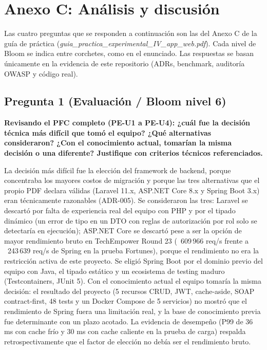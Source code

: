 \documentclass[12pt,a4paper]{article}
\begin{document}
\newpage

\section*{Anexo C: Análisis y discusión}

Las cuatro preguntas que se responden a continuación son las del Anexo C de la guía de
práctica (\textit{guia\_practica\_experimental\_IV\_app\_web.pdf}). Cada nivel de Bloom
se indica entre corchetes, como en el enunciado. Las respuestas se basan únicamente en
la evidencia de este repositorio (ADRs, benchmark, auditoría OWASP y código real).

\subsection*{Pregunta 1 (Evaluación / Bloom nivel 6)}

\textbf{Revisando el PFC completo (PE-U1 a PE-U4): ¿cuál fue la decisión técnica más
difícil que tomó el equipo? ¿Qué alternativas consideraron? ¿Con el conocimiento actual,
tomarían la misma decisión o una diferente? Justifique con criterios técnicos
referenciados.}

La decisión más difícil fue la elección del framework de backend, porque concentraba los
mayores costos de migración y porque las tres alternativas que el propio PDF declara
válidas (Laravel 11.x, ASP.NET Core 8.x y Spring Boot 3.x) eran técnicamente razonables
(ADR-005). Se consideraron las tres: Laravel se descartó por falta de experiencia real
del equipo con PHP y por el tipado dinámico (un error de tipo en un DTO con reglas de
autorización por rol solo se detectaría en ejecución); ASP.NET Core se descartó pese a ser
la opción de mayor rendimiento bruto en TechEmpower Round 23 (~609\,966 req/s frente a
~243\,639 req/s de Spring en la prueba Fortunes), porque el rendimiento no era la
restricción activa de este proyecto. Se eligió Spring Boot por el dominio previo del
equipo con Java, el tipado estático y un ecosistema de testing maduro (Testcontainers,
JUnit 5). Con el conocimiento actual el equipo tomaría la misma decisión: el resultado
del proyecto (5 recursos CRUD, JWT, cache-aside, SOAP contract-first, 48 tests y un
Docker Compose de 5 servicios) no mostró que el rendimiento de Spring fuera una limitación
real, y la base de conocimiento previa fue determinante con un plazo acotado. La evidencia
de desempeño (P99 de 36 ms con cache frío y 30 ms con cache caliente en la prueba de carga)
respalda retrospectivamente que el factor de elección no debía ser el rendimiento bruto.
\end{document}
